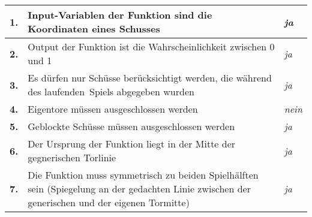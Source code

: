 \tablelasttail{}
\begin{center}%
\begin{supertabular}{ | P{1.5cm} | P{8cm} | P{2.5cm} |}
\vspace*{1mm}\textbf{1.} 	& \vspace*{1mm}Input-Variablen der Funktion sind die Koordinaten eines Schusses& \vspace*{1mm}	\textit{ja}\\
\hline
\vspace*{1mm}\textbf{2.}	& \vspace*{1mm}Output der Funktion ist die Wahrscheinlichkeit zwischen 0 und 1	& \vspace*{1mm}\textit{ja} 	\\
\hline
\vspace*{1mm}\textbf{3.}	& \vspace*{1mm}Es dürfen nur Schüsse berücksichtigt werden, die während des \glqq laufenden\grqq~Spiels abgegeben wurden  	& \vspace*{1mm}\textit{ja}  	\\
\hline
\vspace*{1mm}\textbf{4.}	& \vspace*{1mm}Eigentore müssen ausgeschlossen werden  	& \vspace*{1mm}\textit{nein}  	\\
\hline
\vspace*{1mm}\textbf{5.}	& \vspace*{1mm}Geblockte Schüsse müssen ausgeschlossen werden\	& \vspace*{1mm}\textit{ja}  	\\
\hline
\vspace*{1mm}\textbf{6.}	& \vspace*{1mm}Der Ursprung der Funktion liegt in der Mitte der gegnerischen Torlinie & \vspace*{1mm}\textit{ja}  	\\
\hline
\vspace*{1mm}\textbf{7.}	& \vspace*{1mm}Die Funktion muss symmetrisch zu beiden Spielhälften sein (Spiegelung an der gedachten Linie zwischen der generischen und der eigenen Tormitte) & \vspace*{1mm}\textit{ja}  	\\
\hline
\end{supertabular}
\end{center}
